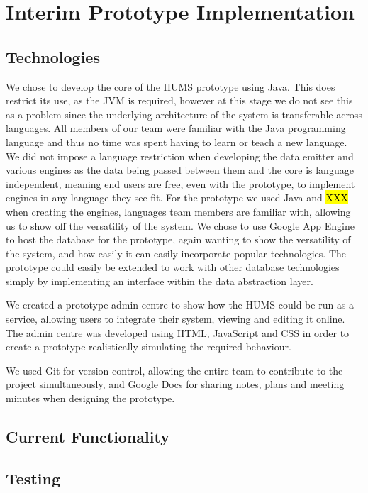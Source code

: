 \documentclass[10pt,a4paper]{article}
\begin{document}

\section{Interim Prototype Implementation}

\subsection{Technologies}
We chose to develop the core of the HUMS prototype using Java. This does restrict its use, as the JVM is required, however at this stage we do not see this as a problem since the underlying architecture of the system is transferable across languages.
All members of our team were familiar with the Java programming language and thus no time was spent having to learn or teach a new language. 
We did not impose a language restriction when developing the data emitter and various engines as the data being passed between them and the core is language independent, meaning end users are free, even with the prototype, to implement engines in any language they see fit. For the prototype we used Java and \hl{XXX} when creating the engines, languages team members are familiar with, allowing us to show off the versatility of the system.
We chose to use Google App Engine to host the database for the prototype, again wanting to show the versatility of the system, and how easily it can easily incorporate popular technologies. The prototype could easily be extended to work with other database technologies simply by implementing an interface within the data abstraction layer.

We created a prototype admin centre to show how the HUMS could be run as a service, allowing users to integrate their system, viewing and editing it online. The admin centre was developed using HTML, JavaScript and CSS in order to create a prototype realistically simulating the required behaviour.

We used Git for version control, allowing the entire team to contribute to the project simultaneously, and Google Docs for sharing notes, plans and meeting minutes when designing the prototype.
\subsection{Current Functionality}

\subsection{Testing}
\end{document}
